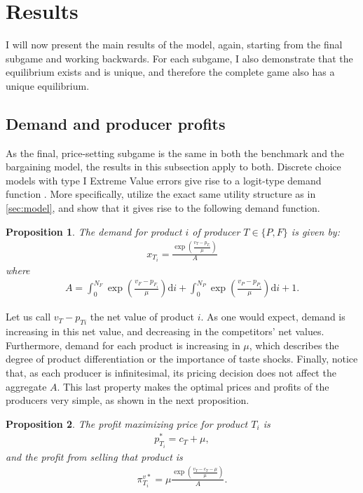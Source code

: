\documentclass[a4paper]{article}
\newtheorem{proposition}{Proposition}
\newcommand{\di}{\mathrm{d}i}
\begin{document}
\section{Results}

I will now present the main results of the model, again, starting from the final subgame and working backwards.
For each subgame, I also demonstrate that the equilibrium exists and is unique, and therefore the complete game also has a unique equilibrium.

\subsection{Demand and producer profits}

As the final, price-setting subgame is the same in both the benchmark and the bargaining model, the results in this subsection apply to both.
Discrete choice models with type I Extreme Value errors give rise to a logit-type demand function \parencite[e.g.][]{small1981applied}.
More specifically, \textcite[]{anderson2021hybrid} utilize the exact same utility structure as in \cref{sec:model}, and show that it gives rise to the following demand function.
\begin{proposition}
    \label{prop:demand_function}
    The demand for product $i$ of producer $T \in \{P, F\}$ is given by:
    \begin{align*}
        x_{T_i} = \frac{\exp\left( \frac{v_T - p_{T_i}}{\mu} \right)}{A}
    \end{align*}
    where
    \begin{align}
        A = \int_0^{N_F} \exp\left( \frac{v_F - p_{F_i}}{\mu} \right) \di + \int_0^{N_P} \exp\left( \frac{v_P - p_{P_i}}{\mu} \right) \di + 1.
        \label{eq:aggregate}
    \end{align}
\end{proposition}

Let us call $v_T - p_{Ti}$ the net value of product $i$.
As one would expect, demand is increasing in this net value, and decreasing in the competitors' net values.
Furthermore, demand for each product is increasing in $\mu$, which describes the degree of product differentiation or the importance of taste shocks.
Finally, notice that, as each producer is infinitesimal, its pricing decision does not affect the aggregate $A$.
This last property makes the optimal prices and profits of the producers very simple, as shown in the next proposition.
\begin{proposition}
    \label{prop:optimal_profit}
    The profit maximizing price for product $T_i$ is
    \begin{align*}
        p^*_{T_i} = c_T + \mu,
    \end{align*}
    and the profit from selling that product is
    \begin{align}
        \pi^{v*}_{T_i} = \mu \frac{\exp \left( \frac{v_T - c_T - \mu}{\mu} \right)}{A}.
        \label{eq:optimal_profit}
    \end{align}
\end{proposition}
\end{document}
